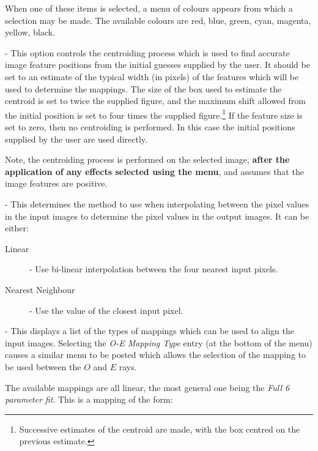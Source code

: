 \begin{description}
When one of these items is selected, a menu of colours appears from which
a selection may be made. The available colours are red, blue, green,
cyan, magenta, yellow, black.

\item [\mylabel{POLREG_FEATURE_SIZE}{\em Feature Size}] - This option
controls the centroiding process which is used to find accurate image
feature positions from the initial guesses supplied by the user. It
should be set to an estimate of the typical width (in pixels) of the
features which will be used to determine the mappings. The size of the
box used to estimate the centroid is set to twice the supplied figure,
and the maximum shift allowed from the initial position is set to four
times the supplied figure.\footnote{Successive estimates of the centroid
are made, with the box centred on the previous estimate.} If the feature
size is set to zero, then no centroiding is performed. In this case the
initial positions supplied by the user are used directly.

Note, the centroiding process is performed on the selected image, {\bf
after the application of any effects selected using the  menu}, and assumes that the image features
are positive.

\item [\mylabel{POLREG_INTERPOLATION_METHOD}{\em Interpolation Method}] -
This determines the method to use when interpolating between the pixel
values in the input images to determine the pixel values in the output
images. It can be either:

\begin{description}
\item [Linear] - Use bi-linear interpolation between the four nearest
input pixels.
\item [Nearest Neighbour] - Use the value of the closest input pixel.
\end{description}

\item [\mylabel{POLREG_MAP_TYPES}{\em Mapping Types}] - This displays a list of
the types of mappings which can be used to align the input images.
Selecting the {\em O-E Mapping Type} entry (at the bottom of the menu)
causes a similar menu to be posted which allows the selection of the
mapping to be used between the $O$ and $E$ rays.

The available mappings are all linear, the most general one being the
{\em Full 6 parameter fit}. This is a mapping of the form:


\end{description}
